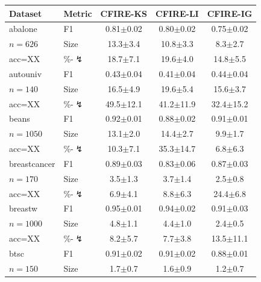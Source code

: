 \begin{tabular}{llccc}
\toprule
Dataset & Metric & CFIRE-KS & CFIRE-LI & CFIRE-IG \\
\midrule
abalone & F1 & 0.81{\scriptsize$\pm$0.02} & 0.80{\scriptsize$\pm$0.02} & 0.75{\scriptsize$\pm$0.02} \\
$n=626$ & Size & 13.3{\scriptsize$\pm$3.4} & 10.8{\scriptsize$\pm$3.3} & 8.3{\scriptsize$\pm$2.7} \\
acc=XX & \%-$\lightning$ & 18.7{\scriptsize$\pm$7.1} & 19.6{\scriptsize$\pm$4.0} & 14.8{\scriptsize$\pm$5.5} \\
\midrule
autouniv & F1 & 0.43{\scriptsize$\pm$0.04} & 0.41{\scriptsize$\pm$0.04} & 0.44{\scriptsize$\pm$0.04} \\
$n=140$ & Size & 16.5{\scriptsize$\pm$4.9} & 19.6{\scriptsize$\pm$5.4} & 15.6{\scriptsize$\pm$3.7} \\
acc=XX & \%-$\lightning$ & 49.5{\scriptsize$\pm$12.1} & 41.2{\scriptsize$\pm$11.9} & 32.4{\scriptsize$\pm$15.2} \\
\midrule
beans & F1 & 0.92{\scriptsize$\pm$0.01} & 0.88{\scriptsize$\pm$0.02} & 0.91{\scriptsize$\pm$0.01} \\
$n=1050$ & Size & 13.1{\scriptsize$\pm$2.0} & 14.4{\scriptsize$\pm$2.7} & 9.9{\scriptsize$\pm$1.7} \\
acc=XX & \%-$\lightning$ & 10.3{\scriptsize$\pm$7.1} & 35.3{\scriptsize$\pm$14.7} & 6.8{\scriptsize$\pm$6.3} \\
\midrule
breastcancer & F1 & 0.89{\scriptsize$\pm$0.03} & 0.83{\scriptsize$\pm$0.06} & 0.87{\scriptsize$\pm$0.03} \\
$n=170$ & Size & 3.5{\scriptsize$\pm$1.3} & 3.7{\scriptsize$\pm$1.4} & 2.5{\scriptsize$\pm$0.8} \\
acc=XX & \%-$\lightning$ & 6.9{\scriptsize$\pm$4.1} & 8.8{\scriptsize$\pm$6.3} & 24.4{\scriptsize$\pm$6.8} \\
\midrule
breastw & F1 & 0.95{\scriptsize$\pm$0.01} & 0.94{\scriptsize$\pm$0.02} & 0.91{\scriptsize$\pm$0.03} \\
$n=1000$ & Size & 4.8{\scriptsize$\pm$1.1} & 4.4{\scriptsize$\pm$1.0} & 2.4{\scriptsize$\pm$0.5} \\
acc=XX & \%-$\lightning$ & 8.2{\scriptsize$\pm$5.7} & 7.7{\scriptsize$\pm$3.8} & 13.5{\scriptsize$\pm$11.1} \\
\midrule
btsc & F1 & 0.91{\scriptsize$\pm$0.02} & 0.91{\scriptsize$\pm$0.02} & 0.88{\scriptsize$\pm$0.01} \\
$n=150$ & Size & 1.7{\scriptsize$\pm$0.7} & 1.6{\scriptsize$\pm$0.9} & 1.2{\scriptsize$\pm$0.7} \\

\end{tabular}
